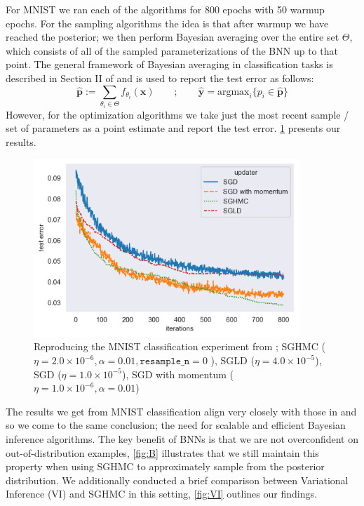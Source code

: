 For MNIST we ran each of the algorithms for 800 epochs with 50 warmup epochs. For the sampling algorithms the idea is that after warmup we have reached the posterior; we then perform Bayesian averaging over the entire set $\Theta$, which consists of all of the sampled parameterizations of the BNN up to that point. The general framework of Bayesian averaging in classification tasks is described in Section II of \cite{hands-on-bnn} and is used to report the test error as follows:
$$\mathbf{\hat p} := \sum_{\theta_i \in \Theta} f_{\theta_i} (\mathbf{x}) \qquad ; \qquad \mathbf{\hat y} = \text{argmax}_{i} \{ p_i \in \mathbf{\hat p} \}$$
However, for the optimization algorithms we take just the most recent sample / set of parameters as a point estimate and report the test error.  \cref{fig:MNIST} presents our results.
\begin{figure}[h!]
\centering
\includegraphics[width=100mm]{parts/Images/MNIST.png}
\caption{Reproducing the MNIST classification experiment from \cite{sghmc}; SGHMC ($\eta = 2.0\times 10^{-6}, \alpha=0.01, \texttt{resample\_n} =0$ ), SGLD ($\eta = 4.0\times 10^{-5}$), SGD ($\eta = 1.0\times 10^{-5}$), SGD with momentum ($\eta = 1.0\times 10^{-6}, \alpha=0.01$)}
\label{fig:MNIST}
\end{figure}
The results we get from MNIST classification align very closely with those in \cite{sghmc} and so we come to the same conclusion; the need for scalable and efficient Bayesian inference algorithms. The key benefit of BNNs is that we are not overconfident on out-of-distribution examples, \cref{fig:B} illustrates that we still maintain this property when using SGHMC to approximately sample from the posterior distribution. We additionally conducted a brief comparison between Variational Inference (VI) and SGHMC in this setting, \cref{fig:VI} outlines our findings.
